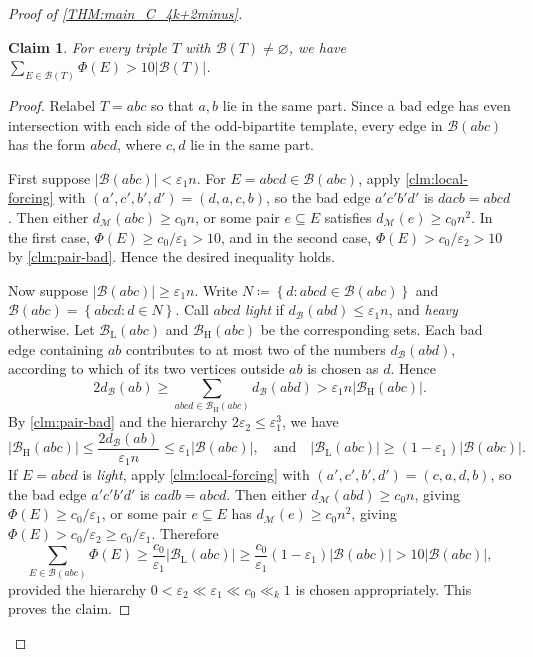 \documentclass[10pt,a4paper]{article}
\theoremstyle{plain}
\newtheorem{claim}[claim]{Claim}
\theoremstyle{definition}
\begin{document}
\begin{proof}[Proof of \cref{THM:main_C_4k+2minus}]
\begin{claim}\label{clm:B-of-T-all}
For every triple $T$ with $\mathcal B(T)\ne\varnothing$, we have $\sum_{E\in\mathcal B(T)}\Phi(E)>10|\mathcal B(T)|$. 
\end{claim}

\begin{proof}
Relabel $T=abc$ so that $a,b$ lie in the same part. Since a bad edge has even intersection with each side of the odd-bipartite template, every edge in $\mathcal B(abc)$ has the form $abcd$, where $c,d$ lie in the same part.

First suppose $|\mathcal B(abc)|<\varepsilon_1n$. For $E=abcd\in\mathcal B(abc)$, apply \cref{clm:local-forcing} with $(a',c',b',d')=(d,a,c,b)$, so the bad edge $a'c'b'd'$ is $dacb=abcd$. Then either $d_{\mathcal M}(abc)\ge c_0n$, or some pair $e\subseteq E$ satisfies $d_{\mathcal M}(e)\ge c_0n^2$. In the first case, $\Phi(E)\ge c_0/\varepsilon_1>10$, and in the second case, $\Phi(E)>c_0/\varepsilon_2>10$ by \cref{clm:pair-bad}. Hence the desired inequality holds.

Now suppose $|\mathcal B(abc)|\ge\varepsilon_1n$. Write $N\coloneqq\left\{d\colon abcd\in\mathcal B(abc)\right\}$ and $\mathcal B(abc)=\left\{abcd\colon d\in N\right\}$. 
Call $abcd$ \emph{light} if $d_{\mathcal B}(abd)\le\varepsilon_1n$, and \emph{heavy} otherwise. Let $\mathcal B_{\mathrm L}(abc)$ and $\mathcal B_{\mathrm H}(abc)$ be the corresponding sets.
Each bad edge containing $ab$ contributes to at most two of the numbers $d_{\mathcal B}(abd)$, according to which of its two vertices outside $ab$ is chosen as $d$. Hence
\[
2d_{\mathcal B}(ab)
\ge \sum_{abcd\in\mathcal B_{\mathrm H}(abc)}d_{\mathcal B}(abd)
>\varepsilon_1n|\mathcal B_{\mathrm H}(abc)|.
\]
By \cref{clm:pair-bad} and the hierarchy $2\varepsilon_2\le\varepsilon_1^3$, we have
\[
|\mathcal B_{\mathrm H}(abc)|\le\frac{2d_{\mathcal B}(ab)}{\varepsilon_1n}
\le\varepsilon_1|\mathcal B(abc)|,
\quad\text{and}\quad
|\mathcal B_{\mathrm L}(abc)|\ge(1-\varepsilon_1)|\mathcal B(abc)|.
\]
If $E=abcd$ is \emph{light}, apply \cref{clm:local-forcing} with $(a',c',b',d')=(c,a,d,b)$, so the bad edge $a'c'b'd'$ is $cadb=abcd$. Then either $d_{\mathcal M}(abd)\ge c_0n$, giving $\Phi(E)\ge c_0/\varepsilon_1$, or some pair $e\subseteq E$ has $d_{\mathcal M}(e)\ge c_0n^2$, giving $\Phi(E)>c_0/\varepsilon_2\ge c_0/\varepsilon_1$.
Therefore
\[
\sum_{E\in\mathcal B(abc)}\Phi(E)
\ge \frac{c_0}{\varepsilon_1}|\mathcal B_{\mathrm L}(abc)|
\ge \frac{c_0}{\varepsilon_1}(1-\varepsilon_1)|\mathcal B(abc)|
>10|\mathcal B(abc)|,
\]
provided the hierarchy $0<\varepsilon_2\ll\varepsilon_1\ll c_0\ll_k1$ is chosen appropriately. This proves the claim.
\end{proof}


\end{proof}
\end{document}
